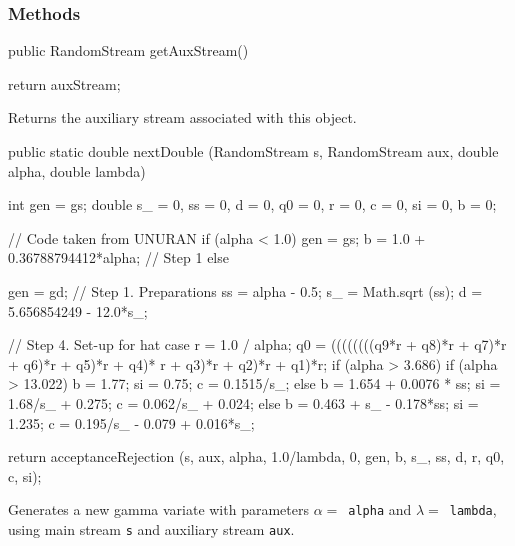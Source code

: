 \subsubsection* {Methods}
\begin{code}

   public RandomStream getAuxStream()\begin{hide} {
      return auxStream;
   }\end{hide}
\end{code}
\begin{tabb}   Returns the auxiliary stream associated with this object.
\end{tabb}
\begin{code}

   public static double nextDouble (RandomStream s, RandomStream aux, 
                                    double alpha, double lambda)\begin{hide} {
      int gen = gs;
      double s_ = 0, ss = 0, d = 0, q0 = 0, r = 0, c = 0, si = 0, b = 0;

         // Code taken from UNURAN
         if (alpha < 1.0) {
            gen = gs;
            b = 1.0 + 0.36788794412*alpha;       // Step 1
         }
         else {
            gen = gd;
            // Step 1. Preparations
            ss = alpha - 0.5;
            s_ = Math.sqrt (ss);
            d = 5.656854249 - 12.0*s_;

            // Step 4. Set-up for hat case
            r = 1.0 / alpha;
            q0 = ((((((((q9*r + q8)*r + q7)*r + q6)*r + q5)*r + q4)*
                    r + q3)*r + q2)*r + q1)*r;
            if (alpha > 3.686) {
              if (alpha > 13.022) {
                b = 1.77;
                si = 0.75;
                c = 0.1515/s_;
              }
              else {
                b = 1.654 + 0.0076 * ss;
                si = 1.68/s_ + 0.275;
                c = 0.062/s_ + 0.024;
              }
            }
            else {
              b = 0.463 + s_ - 0.178*ss;
              si = 1.235;
              c = 0.195/s_ - 0.079 + 0.016*s_;
            }
         }
         return acceptanceRejection
             (s, aux, alpha, 1.0/lambda, 0, gen, b, s_, ss, d, r, q0, c, si);
   }\end{hide}
\end{code}
 \begin{tabb}  Generates a new gamma variate with parameters
 $\alpha = $~\texttt{alpha} and $\lambda = $~\texttt{lambda}, using
  main stream \texttt{s} and auxiliary stream \texttt{aux}.
 \end{tabb}
